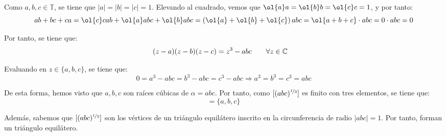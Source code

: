 \begin{ejercicio}
\begin{description}
        Como $a,b,c\in \mathbb{T}$, se tiene que $|a|=|b|=|c|=1$. Elevando al cuadrado, vemos que $\ol{a}a=\ol{b}b=\ol{c}c=1$, y por tanto:
        \begin{equation*}
            ab+bc+ca = \ol{c}cab + \ol{a}abc + \ol{b}abc = \left(\ol{a} + \ol{b} + \ol{c}\right)abc = \ol{a+b+c}\cdot abc = 0\cdot abc = 0
        \end{equation*}

        Por tanto, se tiene que:
        \begin{align*}
            (z-a)(z-b)(z-c) &= z^3 - abc\qquad \forall z\in \mathbb{C}
        \end{align*}

        Evaluando en $z\in \{a,b,c\}$, se tiene que:
        \begin{equation*}
            0=a^3 - abc = b^3 - abc = c^3 - abc \Longrightarrow a^3 = b^3 = c^3 = abc
        \end{equation*}

        De esta forma, hemos visto que $a,b,c$ son raíces cúbicas de $\alpha = abc$. Por tanto, como $[(abc)^{\nicefrac{1}{3}}]$ es finito con tres elementos, se tiene que:
        \begin{equation*}
            [(abc)^{\nicefrac{1}{3}}] = \{a,b,c\}
        \end{equation*}

        Además, sabemos que $[(abc)^{\nicefrac{1}{3}}]$ son los vértices de un triángulo equilátero inscrito en la circunferencia de radio $|abc|=1$. Por tanto, forman un triángulo equilátero.
    \end{description}
\end{ejercicio}

